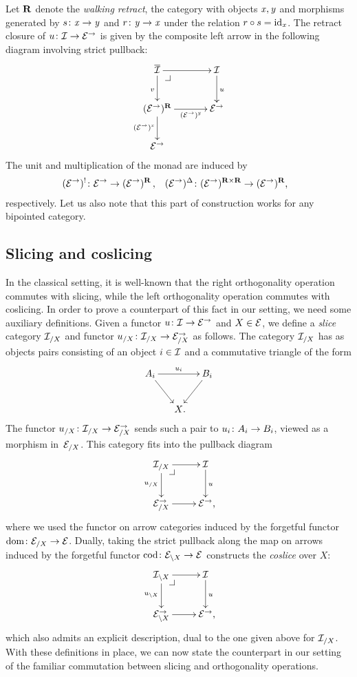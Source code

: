 \documentclass[reqno,10pt,a4paper,oneside,draft]{amsart}
\begin{document}
\begin{remark}
Let $\ret$ denote the \emph{walking retract}, \ie the category with objects $\retA, \retB$ and morphisms generated by $s \co \retA \to \retB$ and $r \co \retB \to \retA$ under the relation $r \cc s = \id_{\retA}$.
The retract closure of $u \co \cal{I} \to \catE^\to$ is given by the composite left arrow in the following diagram involving strict pullback:
\[
\xymatrix@C+1em{
  \overline{\cal{I}}
  \ar[r]
  \ar[d]_v
  \pullback{dr}
&
  \cal{I}
  \ar[d]^{u}
\\
  (\catE^\to)^{\ret}
  \ar[r]_-{(\catE^\to)^{\retB}}
  \ar[d]_{(\catE^\to)^\retA}
&
  \catE^\to
\\
  \catE^\to
}
\]
The unit and multiplication of the monad are induced by
\[
\begin{aligned}
  (\catE^\to)^{\canonical} &\co \catE^\to \to (\catE^\to)^{\ret}
\, ,&
  (\catE^\to)^{\Delta} &\co (\catE^\to)^{\ret \times \ret} \to (\catE^\to)^{\ret}
\rlap{,}
\end{aligned}
\]
respectively.
Let us also note that this part of construction works for any bipointed category.
\end{remark}

\subsection*{Slicing and coslicing}

In the classical setting, it is well-known that the right orthogonality operation commutes with slicing, while the left orthogonality operation commutes with coslicing.
In order to prove a counterpart of this fact in our setting, we need some auxiliary definitions.
Given a functor $u \co \cal{I} \to \catE^\to$ and $X \in \catE$, we define a \emph{slice} category $\cal{I}_{/X}$ and functor $u_{/X} \co \cal{I}_{/X} \to \catE_{/X}^\to$ as follows.
The category $\cal{I}_{/X}$ has as objects pairs consisting of an object $i \in \cal{I}$ and a commutative triangle of the form
\[
\xymatrix@C-1em{
  A_i
  \ar[dr]
  \ar[rr]^{u_i}
&&
  B_i
  \ar[dl]
\\&
  X
\rlap{.}}
\]
The functor $u_{/X} \co \cal{I}_{/X} \to \catE_{/X}^\to$ sends such a pair to $u_i \co A_i \to B_i$, viewed as a morphism in~$\catE_{/X}$.
This category fits into the pullback diagram
\[
\xymatrix{
  \cal{I}_{/X}
  \ar[r]
  \ar[d]_{u_{/X}}
  \pullback{dr}
&
  \cal{I}
  \ar[d]^{u}
\\
  \catE_{/X}^\to
  \ar[r]
&
  \catE^\to
\rlap{,}}
\]
where we used the functor on arrow categories induced by the forgetful functor $\dom \co \catE_{/X} \to \catE$.
Dually, taking the strict pullback along the map on arrows induced by the forgetful functor $\operatorname{cod} \co \catE_{\backslash X} \to \catE$ constructs the \emph{coslice} over $X$:
\[
\xymatrix{
  \cal{I}_{\backslash X}
  \ar[r]
  \ar[d]_{u_{\backslash X}}
  \pullback{dr}
&
  \cal{I}
  \ar[d]^{u}
\\
  \catE_{\backslash X}^\to
  \ar[r]
&
  \catE^\to
\rlap{,}}
\]
which also admits an explicit description, dual to the one given above for $\cal{I}_{/X}$.
With these definitions in place, we can now state the counterpart in our setting of the familiar commutation between slicing and orthogonality operations.
\end{document}
